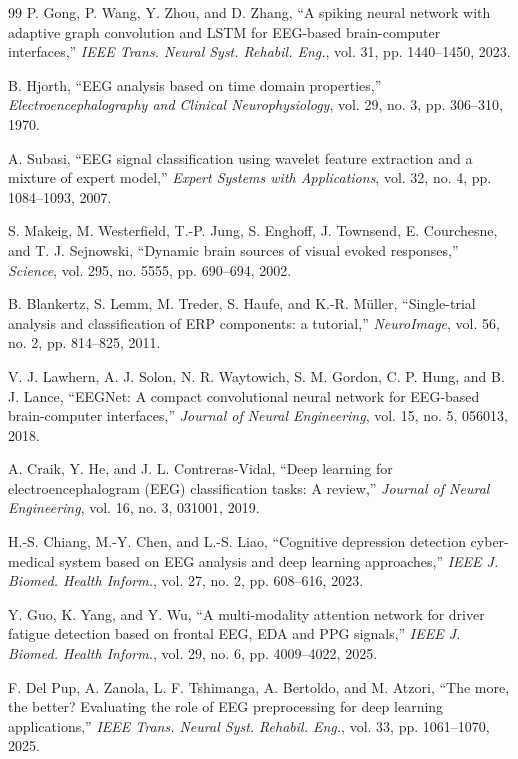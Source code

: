 \documentclass[conference]{IEEEtran}
\begin{document}
\begin{thebibliography}{99}
P. Gong, P. Wang, Y. Zhou, and D. Zhang, ``A spiking neural network with adaptive graph convolution and LSTM for EEG-based brain-computer interfaces,'' \emph{IEEE Trans. Neural Syst. Rehabil. Eng.}, vol. 31, pp. 1440--1450, 2023.

B. Hjorth, ``EEG analysis based on time domain properties,'' \emph{Electroencephalography and Clinical Neurophysiology}, vol. 29, no. 3, pp. 306--310, 1970.

A. Subasi, ``EEG signal classification using wavelet feature extraction and a mixture of expert model,'' \emph{Expert Systems with Applications}, vol. 32, no. 4, pp. 1084--1093, 2007.

S. Makeig, M. Westerfield, T.-P. Jung, S. Enghoff, J. Townsend, E. Courchesne, and T. J. Sejnowski, ``Dynamic brain sources of visual evoked responses,'' \emph{Science}, vol. 295, no. 5555, pp. 690--694, 2002.

B. Blankertz, S. Lemm, M. Treder, S. Haufe, and K.-R. M\"uller, ``Single-trial analysis and classification of ERP components: a tutorial,'' \emph{NeuroImage}, vol. 56, no. 2, pp. 814--825, 2011.

V. J. Lawhern, A. J. Solon, N. R. Waytowich, S. M. Gordon, C. P. Hung, and B. J. Lance, ``EEGNet: A compact convolutional neural network for EEG-based brain-computer interfaces,'' \emph{Journal of Neural Engineering}, vol. 15, no. 5, 056013, 2018.

A. Craik, Y. He, and J. L. Contreras-Vidal, ``Deep learning for electroencephalogram (EEG) classification tasks: A review,'' \emph{Journal of Neural Engineering}, vol. 16, no. 3, 031001, 2019.

H.-S. Chiang, M.-Y. Chen, and L.-S. Liao, ``Cognitive depression detection cyber-medical system based on EEG analysis and deep learning approaches,'' \emph{IEEE J. Biomed. Health Inform.}, vol. 27, no. 2, pp. 608--616, 2023.

Y. Guo, K. Yang, and Y. Wu, ``A multi-modality attention network for driver fatigue detection based on frontal EEG, EDA and PPG signals,'' \emph{IEEE J. Biomed. Health Inform.}, vol. 29, no. 6, pp. 4009--4022, 2025.

F. Del Pup, A. Zanola, L. F. Tshimanga, A. Bertoldo, and M. Atzori, ``The more, the better? Evaluating the role of EEG preprocessing for deep learning applications,'' \emph{IEEE Trans. Neural Syst. Rehabil. Eng.}, vol. 33, pp. 1061--1070, 2025.


\end{thebibliography}
\end{document}
